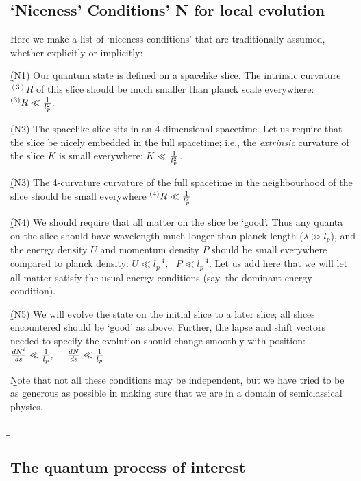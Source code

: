 \documentclass[12pt]{article}
\begin{document}
\subsection{`Niceness' Conditions' N for local evolution}\label{n}


Here we make a list of `niceness conditions' that are traditionally assumed, whether explicitly or implicitly:

\b

(N1) Our quantum state is defined on a spacelike slice. The intrinsic curvature ${}^{(3)} R$ of this slice should be much smaller than planck scale everywhere: ${}^{(3)} R\ll {1\over l_p^2}$. 

\b

(N2) The spacelike slice sits in an 4-dimensional spacetime. Let us require that the slice be nicely embedded in the full spacetime; i.e., the {\it extrinsic} curvature of the slice $K$ is small everywhere: $K\ll {1\over l_p^2}$. 

\b

(N3) The 4-curvature curvature of the full spacetime in the neighbourhood of the slice should be small everywhere ${}^{(4)} R\ll {1\over l_p^2}$

\b


(N4) We should require that all matter on the slice be `good'. Thus any quanta  on the slice should have wavelength much longer than planck length ($\lambda\gg l_p$), and the  energy density $U$ and momentum density $P$ should be small everywhere compared to planck density: $U\ll l_p^{-4}, ~~~P\ll l_p^{-4}$. 
Let us add here that we will let all matter satisfy the usual energy conditions (say, the dominant energy condition). 

\b

(N5) We will evolve the state on the initial slice to a later slice; all slices encountered should be `good' as above. Further, the lapse and shift vectors needed to specify the evolution should change smoothly with position: $
{dN^i\over ds}\ll {1\over l_p}, ~~~~{dN\over ds}\ll {1\over l_p} $

\b

\b

Note that not all these conditions may be   independent, but we have tried to be as generous as possible in making sure that we are in a domain of semiclassical physics. 

\b

\b

\subsection{The quantum process of interest}
\end{document}
